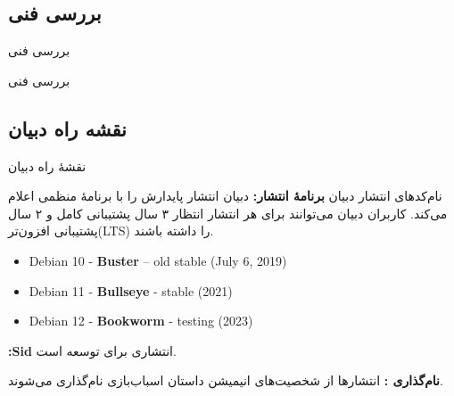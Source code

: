 \documentclass[hyperref={colorlinks}]{beamer}
\begin{document}
\begin{persian}
\section{بررسی فنی}

\begin{frame}{بررسی فنی}
\begin{block}{}
بررسی فنی
\end{block}
\end{frame}
\end{persian}

\begin{persian}
\section{نقشه راه دبیان}
\begin{frame}{نقشهٔ راه دبیان}

\begin{block}{نام‌کدهای انتشار دبیان}
\textbf{برنامهٔ انتشار: } 
دبیان انتشار پایدارش را با برنامهٔ منظمی اعلام می‌کند.
کاربران دبیان می‌توانند برای هر انتشار انتظار ۳ سال پشتیبانی کامل و ۲ سال پشتیبانی افزون‌تر(LTS) را داشته باشند.

\begin{latin}
\begin{itemize}

\item Debian 10 - \textbf{Buster} – old stable (July 6, 2019)
\item Debian 11 - \textbf{Bullseye} -  stable (2021)
\item Debian 12  - \textbf{Bookworm} - testing (2023)

\end{itemize}
\end{latin}




\textbf{:Sid} انتشاری برای توسعه است.


\textbf{ نام‌گذاری :}
انتشارها از شخصیت‌های انیمیشن داستان اسباب‌بازی نام‌گذاری می‌شوند.

\end{block}

\end{frame}
\end{persian}
\end{document}
